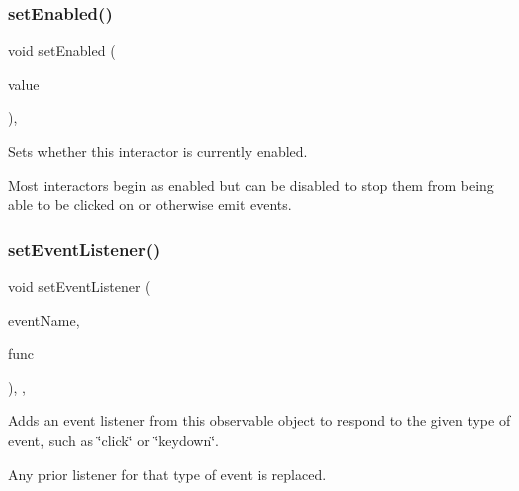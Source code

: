 \subsubsection{\texorpdfstring{set\+Enabled()}{setEnabled()}}
{\footnotesize\ttfamily void set\+Enabled (\begin{DoxyParamCaption}\item[{bool}]{value }\end{DoxyParamCaption})\hspace{0.3cm}{\ttfamily [virtual]}, {\ttfamily [inherited]}}



Sets whether this interactor is currently enabled. 

Most interactors begin as enabled but can be disabled to stop them from being able to be clicked on or otherwise emit events. \mbox{\label{classGObservable_ad2f6d34961c50f6c1e0659990b79f741}} 
\subsubsection{\texorpdfstring{set\+Event\+Listener()}{setEventListener()}\hspace{0.1cm}{\footnotesize\ttfamily [1/2]}}
{\footnotesize\ttfamily void set\+Event\+Listener (\begin{DoxyParamCaption}\item[{const std\+::string \&}]{event\+Name,  }\item[{G\+Event\+Listener}]{func }\end{DoxyParamCaption})\hspace{0.3cm}{\ttfamily [protected]}, {\ttfamily [virtual]}, {\ttfamily [inherited]}}



Adds an event listener from this observable object to respond to the given type of event, such as \char`\"{}click\char`\"{} or \char`\"{}keydown\char`\"{}. 

Any prior listener for that type of event is replaced. \mbox{\label{classGObservable_abac4cb9f9e626e010e87f5d91573c8a5}} 
